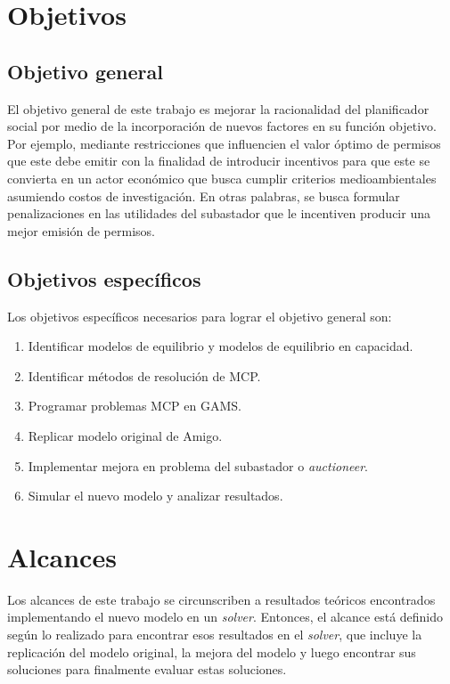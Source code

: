 \section{Objetivos}
\subsection{Objetivo general}
El objetivo general de este trabajo es mejorar la racionalidad del planificador social por medio de la incorporación de nuevos factores en su función objetivo. Por ejemplo, mediante restricciones que influencien el valor óptimo de permisos que este debe emitir con la finalidad de introducir incentivos para que este se convierta en un actor económico que busca cumplir criterios medioambientales asumiendo costos de investigación. En otras palabras, se busca formular penalizaciones en las utilidades del subastador que le incentiven producir una mejor emisión de permisos.

\subsection{Objetivos específicos}
Los objetivos específicos necesarios para lograr el objetivo general son:

\begin{enumerate}
\item Identificar modelos de equilibrio y modelos de equilibrio en capacidad.
\item Identificar métodos de resolución de MCP.
\item Programar problemas MCP en GAMS.
\item Replicar modelo original de Amigo.
\item Implementar mejora en problema del subastador o \emph{auctioneer}.
\item Simular el nuevo modelo y analizar resultados.
\end{enumerate}


\section{Alcances}
Los alcances de este trabajo se circunscriben a resultados teóricos encontrados implementando el nuevo modelo en un \emph{solver}. Entonces, el alcance está definido según lo realizado para encontrar esos resultados en el \emph{solver}, que incluye la replicación del modelo original, la mejora del modelo y luego encontrar sus soluciones para finalmente evaluar estas soluciones.
\vspace{2.5mm}

